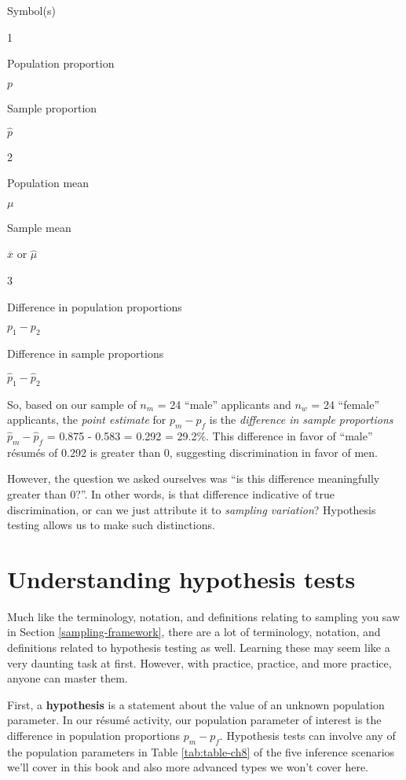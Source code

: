 \documentclass[
]{book}
\begin{document}
Symbol(s)

1

Population proportion

\(p\)

Sample proportion

\(\widehat{p}\)

2

Population mean

\(\mu\)

Sample mean

\(\overline{x}\) or \(\widehat{\mu}\)

3

Difference in population proportions

\(p_1 - p_2\)

Difference in sample proportions

\(\widehat{p}_1 - \widehat{p}_2\)

So, based on our sample of \(n_m\) = 24 ``male'' applicants and \(n_w\) = 24 ``female'' applicants, the \emph{point estimate} for \(p_{m} - p_{f}\) is the \emph{difference in sample proportions} \(\widehat{p}_{m} -\widehat{p}_{f}\) = 0.875 - 0.583 = 0.292 = 29.2\%. This difference in favor of ``male'' résumés of 0.292 is greater than 0, suggesting discrimination in favor of men.

However, the question we asked ourselves was ``is this difference meaningfully greater than 0?''. In other words, is that difference indicative of true discrimination, or can we just attribute it to \emph{sampling variation}? Hypothesis testing allows us to make such distinctions.

\hypertarget{understanding-ht}{%
\section{Understanding hypothesis tests}\label{understanding-ht}}

Much like the terminology, notation, and definitions relating to sampling you saw in Section \ref{sampling-framework}, there are a lot of terminology, notation, and definitions related to hypothesis testing as well. Learning these may seem like a very daunting task at first. However, with practice, practice, and more practice, anyone can master them.

First, a \textbf{hypothesis}  is a statement about the value of an unknown population parameter. In our résumé activity, our population parameter of interest is the difference in population proportions \(p_{m} - p_{f}\). Hypothesis tests can involve any of the population parameters in Table \ref{tab:table-ch8} of the five inference scenarios we'll cover in this book and also more advanced types we won't cover here.
\end{document}
